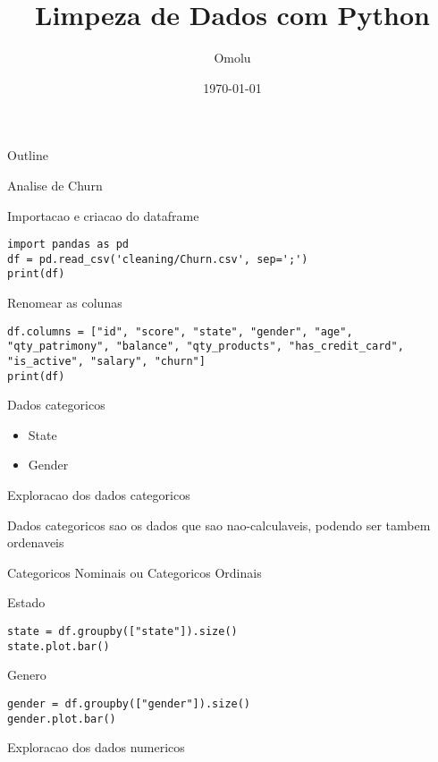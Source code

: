 \documentclass[presentation]{beamer}
\author{Omolu}
\date{\today}
\title{Limpeza de Dados com Python}
\begin{document}
\maketitle
\begin{frame}{Outline}
\tableofcontents
\end{frame}

\begin{frame}[label={sec:org6b1fb3e},fragile]{Analise de Churn}
 \begin{block}{Importacao e criacao do dataframe}
\begin{verbatim}
import pandas as pd
df = pd.read_csv('cleaning/Churn.csv', sep=';')
print(df)
\end{verbatim}
\end{block}
\begin{block}{Renomear as colunas}
\begin{verbatim}
df.columns = ["id", "score", "state", "gender", "age", "qty_patrimony", "balance", "qty_products", "has_credit_card", "is_active", "salary", "churn"]
print(df)
\end{verbatim}
\begin{block}{Dados categoricos}
\begin{itemize}
\item State
\item Gender
\end{itemize}
\end{block}
\end{block}
\begin{block}{Exploracao dos dados categoricos}
\begin{block}{Dados categoricos sao os dados que sao nao-calculaveis, podendo ser tambem ordenaveis}
\end{block}
\begin{block}{Categoricos Nominais ou Categoricos Ordinais}
\end{block}
\begin{block}{Estado}
\begin{verbatim}
state = df.groupby(["state"]).size()
state.plot.bar()
\end{verbatim}
\end{block}
\begin{block}{Genero}
\begin{verbatim}
gender = df.groupby(["gender"]).size()
gender.plot.bar()
\end{verbatim}
\end{block}
\end{block}
\begin{block}{Exploracao dos dados numericos}

\end{block}
\end{frame}
\end{document}
